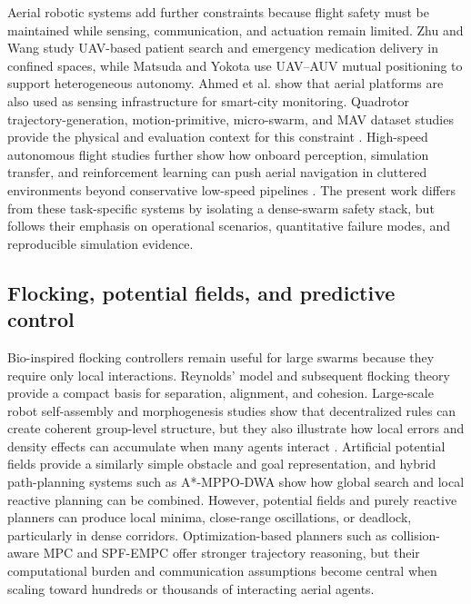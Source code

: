 \documentclass[11pt]{article}
\begin{document}
Aerial robotic systems add further constraints because flight safety must be maintained while sensing, communication, and actuation remain limited. Zhu and Wang \cite{zhu2026patient} study UAV-based patient search and emergency medication delivery in confined spaces, while Matsuda and Yokota \cite{matsuda2026auv} use UAV--AUV mutual positioning to support heterogeneous autonomy. Ahmed et al. \cite{ahmed2026aerial} show that aerial platforms are also used as sensing infrastructure for smart-city monitoring. Quadrotor trajectory-generation, motion-primitive, micro-swarm, and MAV dataset studies provide the physical and evaluation context for this constraint \cite{mellinger2012trajectory,mueller2015motionprimitive,kushleyev2013swarm,burri2016euroc}. High-speed autonomous flight studies further show how onboard perception, simulation transfer, and reinforcement learning can push aerial navigation in cluttered environments beyond conservative low-speed pipelines \cite{loquercio2021learning,kaufmann2023champion}. The present work differs from these task-specific systems by isolating a dense-swarm safety stack, but follows their emphasis on operational scenarios, quantitative failure modes, and reproducible simulation evidence.

\subsection{Flocking, potential fields, and predictive control}

Bio-inspired flocking controllers remain useful for large swarms because they require only local interactions. Reynolds' model \cite{reynolds1987flocks} and subsequent flocking theory \cite{olfati2006flocking} provide a compact basis for separation, alignment, and cohesion. Large-scale robot self-assembly and morphogenesis studies show that decentralized rules can create coherent group-level structure, but they also illustrate how local errors and density effects can accumulate when many agents interact \cite{rubenstein2014programmable,slavkov2018morphogenesis}. Artificial potential fields \cite{khatib1986realtime} provide a similarly simple obstacle and goal representation, and hybrid path-planning systems such as A*-MPPO-DWA \cite{chen2026auv} show how global search and local reactive planning can be combined. However, potential fields and purely reactive planners can produce local minima, close-range oscillations, or deadlock, particularly in dense corridors. Optimization-based planners such as collision-aware MPC \cite{mun2026collision} and SPF-EMPC \cite{zeng2026spfempc} offer stronger trajectory reasoning, but their computational burden and communication assumptions become central when scaling toward hundreds or thousands of interacting aerial agents.
\end{document}
